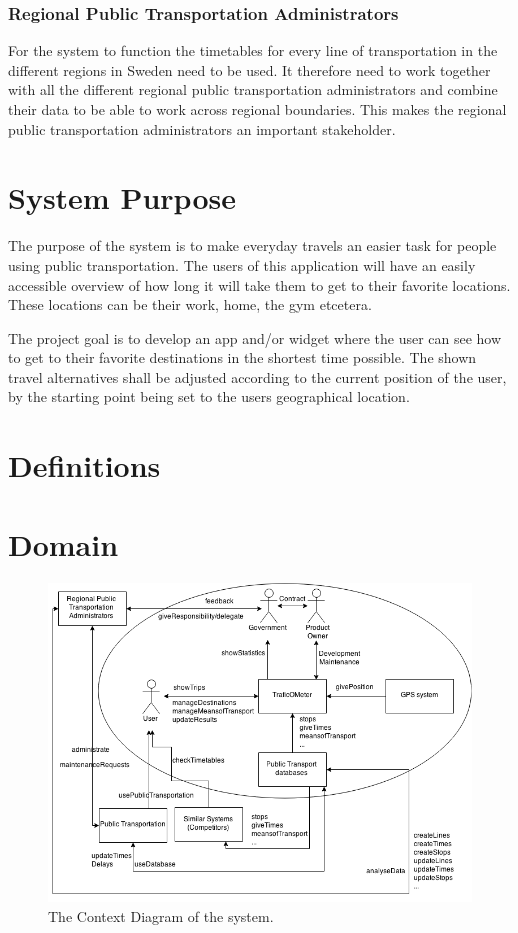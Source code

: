 \documentclass[a4paper]{article}
\begin{document}
			\subsubsection{Regional Public Transportation Administrators}
			For the system to function the timetables for every line of transportation in the different regions in Sweden need to be used. It therefore need to work together with all the different regional public transportation administrators and combine their data to be able to work across regional boundaries. This makes the regional public transportation administrators an important stakeholder.
	
	\section{System Purpose} %
	The purpose of the system is to make everyday travels an easier task for people using public transportation. The users of this application will have an easily accessible overview of how long it will take them to get to their favorite locations. These locations can be their work, home, the gym etcetera.
	
	
The project goal is to develop an app and/or widget where the user can see how to get to their favorite destinations in the shortest time possible. The shown travel alternatives shall be adjusted according to the current position of the user, by the starting point being set to the users geographical location.
	\section{Definitions}
		
	\section{Domain}
		\begin{figure}[H]
				\includegraphics[scale=0.50]{img/Context-v3.png}
			\caption{The Context Diagram of the system.}
		\end{figure}
		
\end{document}
